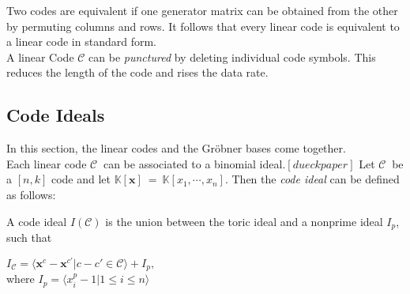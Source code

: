 Two codes are equivalent if one generator matrix can be obtained from the other by permuting columns and rows.
It follows that every linear code is equivalent to a linear code in standard form.\cite{dueckjournal} \\

A linear Code $\mathcal{C}$ can be \textit{punctured} by deleting individual code symbols.
This reduces the length of the code and rises the data rate.


\subsection{Code Ideals}
\label{subsec:codeideals}
In this section, the linear codes and the Gröbner bases come together.\\
Each linear code $\mathcal{C}~$ can be associated to a binomial ideal.$[dueckpaper]$ Let $\mathcal{C}~$ be a $[n,k]$ code and let 
$\mathbb{K}[\textbf{x}]~=~\mathbb{K}[x_{1},\cdots,x_{n}]$.
Then the \textit{code ideal} can be defined as follows:

\begin{env_definition}
\cite{dueckpaper} A code ideal $I(\mathcal{C})$ is the union between the toric ideal and a nonprime ideal $I_{p}$, such that
\begin{center}
$ I_{\mathcal{C}} = \langle \textbf{x}^{c} - \textbf{x}^{c'} | c - c' \in \mathcal{C}  \rangle + I_{p},$\\
\textrm{where}
 $I_{p} = \langle x_{i}^{p} - 1 | 1 \leq i \leq n \rangle $
\end{center}
\end{env_definition}

\newpage

